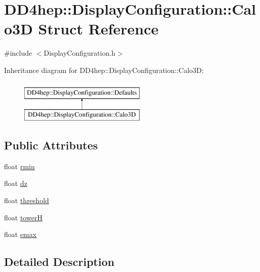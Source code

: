 \hypertarget{struct_d_d4hep_1_1_display_configuration_1_1_calo3_d}{}\section{D\+D4hep\+:\+:Display\+Configuration\+:\+:Calo3D Struct Reference}
\label{struct_d_d4hep_1_1_display_configuration_1_1_calo3_d}


{\ttfamily \#include $<$Display\+Configuration.\+h$>$}

Inheritance diagram for D\+D4hep\+:\+:Display\+Configuration\+:\+:Calo3D\+:\begin{figure}[H]
\begin{center}
\leavevmode
\includegraphics[height=2.000000cm]{struct_d_d4hep_1_1_display_configuration_1_1_calo3_d}
\end{center}
\end{figure}
\subsection*{Public Attributes}
\begin{DoxyCompactItemize}
\item 
float \hyperlink{struct_d_d4hep_1_1_display_configuration_1_1_calo3_d_ade7d636fe0552c821c519d838ec4e9cc}{rmin}
\item 
float \hyperlink{struct_d_d4hep_1_1_display_configuration_1_1_calo3_d_a4c83ddd5abab41aede5327a47d1bffcc}{dz}
\item 
float \hyperlink{struct_d_d4hep_1_1_display_configuration_1_1_calo3_d_a5d8b964880761613aa41ee542ce93a48}{threshold}
\item 
float \hyperlink{struct_d_d4hep_1_1_display_configuration_1_1_calo3_d_a85221f1dde131cdf60a25bffef79325f}{towerH}
\item 
float \hyperlink{struct_d_d4hep_1_1_display_configuration_1_1_calo3_d_a2a0ed0362e5b09927938df5c3d98d6b9}{emax}
\end{DoxyCompactItemize}


\subsection{Detailed Description}


